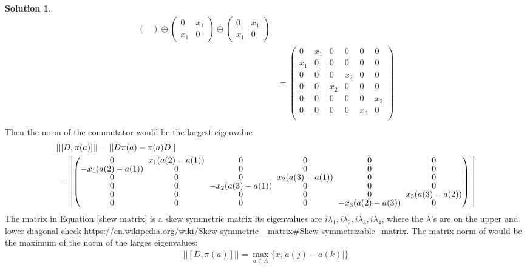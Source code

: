 \documentclass[a4paper]{article}
\theoremstyle{definition}
\theoremstyle{definition}
\theoremstyle{definition}
\theoremstyle{theorem}
\theoremstyle{theorem}
\theoremstyle{theorem}
\theoremstyle{definition}
\newtheorem{solution}{Solution}
\begin{document}
\begin{solution}
\begin{align}
\begin{pmatrix}
        \end{pmatrix} \oplus
        \begin{pmatrix}
            0 & x_1 \\ x_1 & 0
        \end{pmatrix} \oplus
        \begin{pmatrix}
            0 & x_1 \\ x_1 & 0
        \end{pmatrix} \nonumber \\
        &=
        \begin{pmatrix}
            0   & x_1 & 0 & 0 & 0 & 0 \\
            x_1 & 0   & 0 & 0 & 0 & 0 \\
            0   & 0   & 0 & x_2 & 0 & 0 \\
            0   & 0   & x_2 & 0 & 0 & 0 \\
            0   & 0   & 0 & 0 & 0 & x_3 \\
            0   & 0   & 0 & 0 & x_3 & 0 \\
        \end{pmatrix} \\
    \end{align}
    Then the norm of the commutator would be the largest eigenvalue
    \begin{align}
        &||[D, \pi(a)]|| = ||D\pi(a) - \pi(a)D||\nonumber \\
        &=
        \left|\left|
    \setlength{\arraycolsep}{0.1cm}
      \renewcommand{\arraystretch}{0.1}
        \begin{pmatrix}
            0   & x_1(a(2)-a(1)) & 0 & 0 & 0 & 0 \\
            -x_1(a(2)-a(1)) & 0   & 0 & 0 & 0 & 0 \\
            0   & 0   & 0 & x_2(a(3)-a(1)) & 0 & 0 \\
            0   & 0   & -x_2(a(3)-a(1)) & 0 & 0 & 0 \\
            0   & 0   & 0 & 0 & 0 & x_3(a(3)-a(2)) \\
            0   & 0   & 0 & 0 & -x_3(a(2)-a(3)) & 0 \\
        \end{pmatrix}\right|\right| \label{skew matrix}
    \end{align}
The matrix in Equation \ref{shew matrix} is a skew symmetric matrix its eigenvalues
are $i\lambda_1, i\lambda_2, i\lambda_3, i\lambda_4$, where the $\lambda$'s are on the
upper and lower diagonal check \url{https://en.wikipedia.org/wiki/Skew-symmetric_
matrix#Skew-symmetrizable_matrix}. The matrix norm of would be the maximum of the norm of
the larges eigenvalues:
\begin{align}
    ||[D, \pi(a)]|| = \max_{a\in A}\{x_i|a(j)-a(k)|\}
\end{align}
\end{solution}
\end{document}
